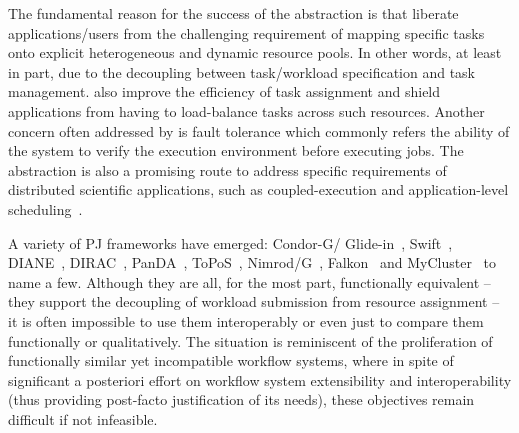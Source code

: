 \documentclass{sig-alternate}
\begin{document}
The fundamental reason for the success of the \pilotjob abstraction is
that \pilotjobs liberate applications/users from the challenging
requirement of mapping specific tasks onto explicit heterogeneous and
dynamic resource pools.  In other words, at least in part, due to the
decoupling between task/workload specification and task
management. \pilotjobs also improve the efficiency of task assignment
and shield applications from having to load-balance tasks across such
resources.
Another concern often addressed by \pilotjobs is fault tolerance which
commonly refers the ability of the \pilotjob system to verify the
execution environment before executing jobs. The \pilotjob abstraction
is also a promising route to address specific requirements of
distributed scientific applications, such as coupled-execution and
application-level
scheduling~\cite{ko-efficient,DBLP:conf/hpdc/KimHMAJ10}.



A variety of PJ frameworks have emerged: Condor-G/
Glide-in~\cite{condor-g}, Swift~\cite{Wilde2011},
DIANE~\cite{Moscicki:908910}, DIRAC~\cite{1742-6596-219-6-062049},
PanDA~\cite{1742-6596-219-6-062041}, ToPoS~\cite{topos},
Nimrod/G~\cite{10.1109/HPC.2000.846563}, Falkon~\cite{1362680} and
MyCluster~\cite{1652061} to name a few. Although they are all, for the
most part, functionally equivalent -- they support the decoupling of
workload submission from resource assignment -- it is often impossible
to use them interoperably or even just to compare them functionally or
qualitatively.  The situation is reminiscent of the proliferation of
functionally similar yet incompatible workflow systems, where in spite
of significant a posteriori effort on workflow system extensibility
and interoperability (thus providing post-facto justification of its
needs), these objectives remain difficult if not infeasible.
\end{document}
